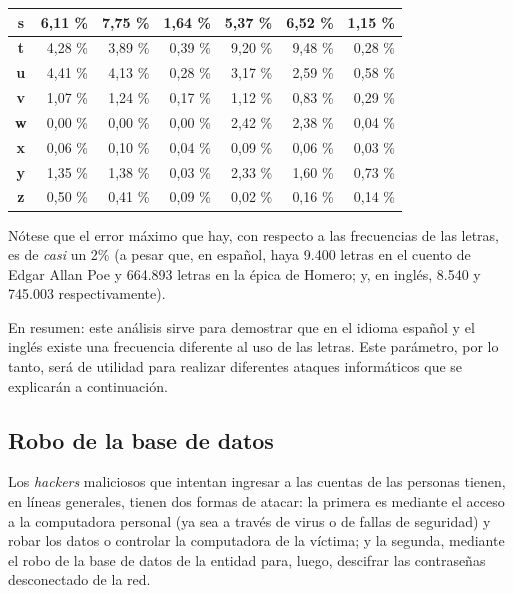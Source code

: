 \documentclass[12pt,a4paper,twoside]{book}
\begin{document}
\begin{center}
\begin{longtable}{|c|r|r|r|r|r|r|}
\textbf{s} & 6,11 \% & 7,75 \% & 1,64  \% & 5,37 \% & 6,52  \% & 1,15  \% \\ \hline
\textbf{t} & 4,28 \% & 3,89 \% & 0,39  \% & 9,20 \% & 9,48  \% & 0,28  \% \\ \hline
\textbf{u} & 4,41 \% & 4,13 \% & 0,28  \% & 3,17 \% & 2,59  \% & 0,58  \% \\ \hline
\textbf{v} & 1,07 \% & 1,24 \% & 0,17  \% & 1,12 \% & 0,83  \% & 0,29  \% \\ \hline
\textbf{w} & 0,00 \% & 0,00 \% & 0,00  \% & 2,42 \% & 2,38  \% & 0,04  \% \\ \hline
\textbf{x} & 0,06 \% & 0,10 \% & 0,04  \% & 0,09 \% & 0,06  \% & 0,03  \% \\ \hline
\textbf{y} & 1,35 \% & 1,38 \% & 0,03  \% & 2,33 \% & 1,60  \% & 0,73  \% \\ \hline
\textbf{z} & 0,50 \% & 0,41 \% & 0,09  \% & 0,02 \% & 0,16  \% & 0,14  \% \\ \hline
\end{longtable}
\end{center}

Nótese que el error máximo que hay, con respecto a las frecuencias de las letras, es de \textit{casi} un 2\% (a pesar que, en español, haya 9.400 letras en el cuento de Edgar Allan Poe y 664.893 letras en la épica de Homero; y, en inglés, 8.540 y 745.003 respectivamente).

En resumen: este análisis sirve para demostrar que en el idioma español y el inglés existe una frecuencia diferente al uso de las letras. Este parámetro, por lo tanto, será de utilidad para realizar diferentes ataques informáticos que se explicarán a continuación.

\subsection{Robo de la base de datos}
Los \textit{hackers} maliciosos que intentan ingresar a las cuentas de las personas tienen, en líneas generales, tienen dos formas de atacar: la primera es mediante el acceso a la computadora personal (ya sea a través de virus o de fallas de seguridad) y robar los datos o controlar la computadora de la víctima; y la segunda, mediante el robo de la base de datos de la entidad para, luego, descifrar las contraseñas desconectado de la red.
\end{document}
